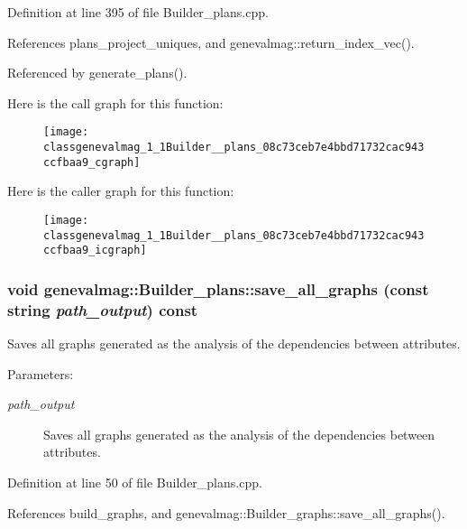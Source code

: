 Definition at line 395 of file Builder\_\-plans.cpp.

References plans\_\-project\_\-uniques, and genevalmag::return\_\-index\_\-vec().

Referenced by generate\_\-plans().

Here is the call graph for this function:\nopagebreak
\begin{figure}[H]
\begin{center}
\leavevmode
\texttt{[image: classgenevalmag\_1\_1Builder\_\_plans\_08c73ceb7e4bbd71732cac943ccfbaa9\_cgraph]}
\end{center}
\end{figure}


Here is the caller graph for this function:\nopagebreak
\begin{figure}[H]
\begin{center}
\leavevmode
\texttt{[image: classgenevalmag\_1\_1Builder\_\_plans\_08c73ceb7e4bbd71732cac943ccfbaa9\_icgraph]}
\end{center}
\end{figure}
\hypertarget{classgenevalmag_1_1Builder__plans_3b70a30427aa135641a75d0d42e23500}{
\subsubsection[{save\_\-all\_\-graphs}]{\setlength{\rightskip}{0pt plus 5cm}void genevalmag::Builder\_\-plans::save\_\-all\_\-graphs (const string {\em path\_\-output}) const}}
\label{classgenevalmag_1_1Builder__plans_3b70a30427aa135641a75d0d42e23500}


Saves all graphs generated as the analysis of the dependencies between attributes. \begin{Desc}
\item[Parameters:]
\begin{description}
\item[{\em path\_\-output}]Saves all graphs generated as the analysis of the dependencies between attributes. \end{description}
\end{Desc}


Definition at line 50 of file Builder\_\-plans.cpp.

References build\_\-graphs, and genevalmag::Builder\_\-graphs::save\_\-all\_\-graphs().

